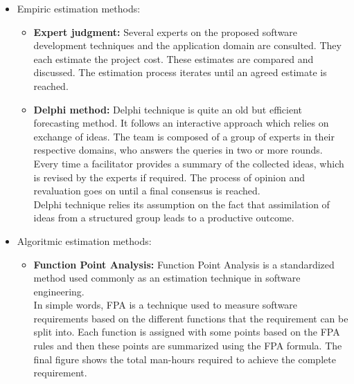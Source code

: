 \begin{itemize}
\item Empiric estimation methods:
\begin{itemize}
\item {\bfseries Expert judgment:}
  Several experts on the proposed software development techniques and
  the application domain are consulted. They each estimate the project
  cost. These estimates are compared and discussed. The estimation
  process iterates until an agreed estimate is reached.
\item {\bfseries Delphi method:}
  Delphi technique is quite an old but efficient forecasting method.
  It follows an interactive approach which relies on exchange of ideas.
  The team is composed of a group of experts in their respective domains,
  who answers the queries in two or more rounds. Every time a facilitator
  provides a summary of the collected ideas, which is revised by the
  experts if required. The process of opinion and revaluation goes on
  until a final consensus is reached.\\
  Delphi technique relies its assumption on the fact that assimilation
  of ideas from a structured group leads to a productive outcome.
\end{itemize}
\ifslides
\newpage
\fi
\item Algoritmic estimation methods:
\begin{itemize}
\item {\bfseries Function Point Analysis:}
  Function Point Analysis is a standardized method used commonly as
  an estimation technique in software engineering.\\
  In simple words, FPA is a technique used to measure software
  requirements based on the different functions that the requirement
  can be split into. Each function is assigned with some points based
  on the FPA rules and then these points are summarized using
  the FPA formula. The final figure shows the total man-hours
  required to achieve the complete requirement.

\end{itemize}
\end{itemize}
